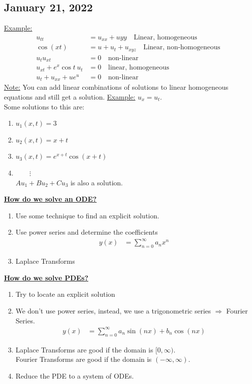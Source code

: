 \documentclass{article}
\newcommand{\topic}[1]{\textbf{\underline{#1}}}
\newcommand{\Ex}{\underline{Example:} }
\newcommand{\note}{\underline{Note:} }
\begin{document}
\subsection*{January 21, 2022}
\Ex
\begin{align}
  u_{tt} & = u_{xx} + u{yy}\quad \text{Linear, homogeneous}\\
  \cos{(xt)} & = u + u_t + u_{xyz}\quad \text{Linear, non-homogeneous}\\
  u_tu_{xt} & = 0\quad \text{non-linear}\\
  u_{xt} + e^x \cos t\ u_t & = 0\quad \text{linear, homogeneous}\\
  u_t + u_{xx} + ue^u & = 0\quad \text{non-linear}
\end{align}
\note You can add linear combinations of solutions to linear homogeneous equations and still get a solution.
\Ex $u_x = u_t$.\\
Some solutions to this are:
\begin{enumerate}
  \item $u_1(x, t) = 3$
  \item $u_2(x, t) = x + t$
  \item $u_3(x, t) = e^{x+t} \cos(x + t)$
  \item $\qquad \vdots$\\
  $Au_1 + Bu_2 + Cu_3$ is also a solution.
\end{enumerate}
\topic{How do we solve an ODE?}
\begin{enumerate}
  \item Use some technique to find an explicit solution.
  \item Use power series and determine the coefficients
  \begin{align}
    y(x) & = \sum^\infty_{n = 0} a_nx^n
  \end{align}
  \item Laplace Transforms
\end{enumerate}
\topic{How do we solve PDEs?}
\begin{enumerate}
  \item Try to locate an explicit solution
  \item We don't use power series, instead, we use a trigonometric series $\Rightarrow$ Fourier Series.
  \begin{align}
    y(x) & = \sum^\infty_{n = 0} a_n \sin(nx) + b_n \cos(nx)
  \end{align}
  \item Laplace Transforms are good if the domain is $[0, \infty)$.\\
  Fourier Transforms are good if the domain is $(-\infty, \infty)$.
  \item Reduce the PDE to a system of ODEs.
\end{enumerate}
\end{document}
